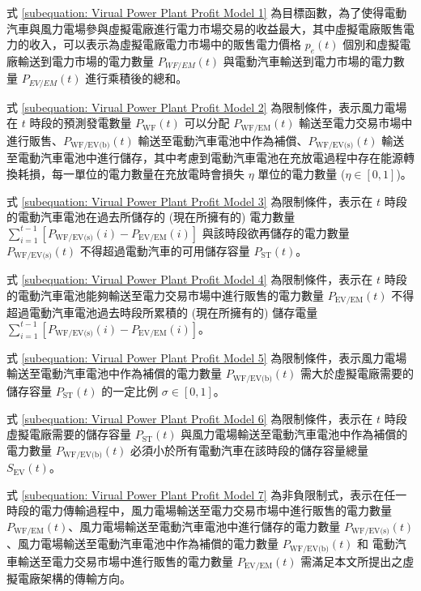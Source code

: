 式 \eqref{subequation: Virual Power Plant Profit Model 1} 為目標函數，為了使得電動汽車與風力電場參與虛擬電廠進行電力市場交易的收益最大，其中虛擬電廠販售電力的收入，可以表示為虛擬電廠電力市場中的販售電力價格 $p_{e} (t)$ 個別和虛擬電廠輸送到電力市場的電力數量 $P_{WF/EM}(t)$ 與電動汽車輸送到電力市場的電力數量 $P_{EV/EM}(t)$ 進行乘積後的總和。

式 \eqref{subequation: Virual Power Plant Profit Model 2} 為限制條件，表示風力電場在 $t$ 時段的預測發電數量 $P_{\text{WF}}(t)$ 可以分配 $P_{\text{WF/EM}}(t)$ 輸送至電力交易市場中進行販售、$P_{\text{WF/EV(b)}}(t)$ 輸送至電動汽車電池中作為補償、$P_{\text{WF/EV(s)}}(t)$ 輸送至電動汽車電池中進行儲存，其中考慮到電動汽車電池在充放電過程中存在能源轉換耗損，每一單位的電力數量在充放電時會損失 $\eta$ 單位的電力數量 ($\eta \in [0, 1]$)。

式 \eqref{subequation: Virual Power Plant Profit Model 3} 為限制條件，表示在 $t$ 時段的電動汽車電池在過去所儲存的 (現在所擁有的) 電力數量 $\sum_{i=1}^{t-1} \left[ P_{\text{WF/EV(s)}}(i) - P_{\text{EV/EM}}(i) \right]$ 與該時段欲再儲存的電力數量 $P_{\text{WF/EV(s)}}(t)$ 不得超過電動汽車的可用儲存容量 $P_{\text{ST}}(t)$。

式 \eqref{subequation: Virual Power Plant Profit Model 4} 為限制條件，表示在 $t$ 時段的電動汽車電池能夠輸送至電力交易市場中進行販售的電力數量 $P_{\text{EV/EM}}(t)$ 不得超過電動汽車電池過去時段所累積的 (現在所擁有的) 儲存電量 $\sum_{i=1}^{t-1} \left[ P_{\text{WF/EV(s)}}(i) - P_{\text{EV/EM}}(i) \right]$。

式 \eqref{subequation: Virual Power Plant Profit Model 5} 為限制條件，表示風力電場輸送至電動汽車電池中作為補償的電力數量 $P_{\text{WF/EV(b)}}(t)$
需大於虛擬電廠需要的儲存容量 $P_{\text{ST}}(t)$ 的一定比例 $\sigma \in [0, 1]$。

式 \eqref{subequation: Virual Power Plant Profit Model 6} 為限制條件，表示在 $t$ 時段虛擬電廠需要的儲存容量 $P_{\text{ST}}(t)$ 與風力電場輸送至電動汽車電池中作為補償的電力數量 $P_{\text{WF/EV(b)}}(t)$ 必須小於所有電動汽車在該時段的儲存容量總量 $S_{\text{EV}}(t)$。

式 \eqref{subequation: Virual Power Plant Profit Model 7} 為非負限制式，表示在任一時段的電力傳輸過程中，風力電場輸送至電力交易市場中進行販售的電力數量 $P_{\text{WF/EM}}(t)$、風力電場輸送至電動汽車電池中進行儲存的電力數量 $P_{\text{WF/EV(s)}}(t)$、風力電場輸送至電動汽車電池中作為補償的電力數量 $P_{\text{WF/EV(b)}}(t)$ 和 電動汽車輸送至電力交易市場中進行販售的電力數量 $P_{\text{EV/EM}}(t)$ 需滿足本文所提出之虛擬電廠架構的傳輸方向。

